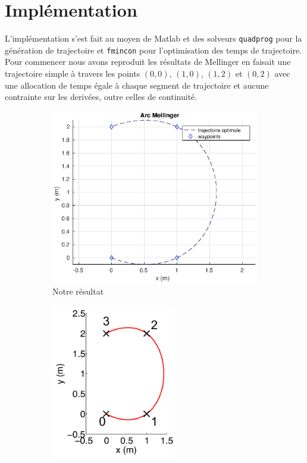\section{Implémentation}

L'implémentation s'est fait au moyen de Matlab et des solveurs \texttt{quadprog} pour la génération de trajectoire et \texttt{fmincon} pour l'optimisation des temps de trajectoire. Pour commencer nous avons reproduit les résultats de Mellinger en faisait une trajectoire simple à travers les points $(0,0)$, $(1,0)$, $(1,2)$ et $(0,2)$ avec une allocation de temps égale à chaque segment de trajectoire et aucune contrainte sur les derivées, outre celles de continuité.

\begin{figure}[h]
\centering
\begin{subfigure}{.5\textwidth}
  \centering
  \includegraphics[width=\textwidth]{fig/arc_mellinger}
  \caption{Notre résultat}
\end{subfigure}%
\begin{subfigure}{.5\textwidth}
  \centering
  \includegraphics[width=0.6\textwidth]{fig/arc_mellinger_orig}

\end{subfigure}
\end{figure}
